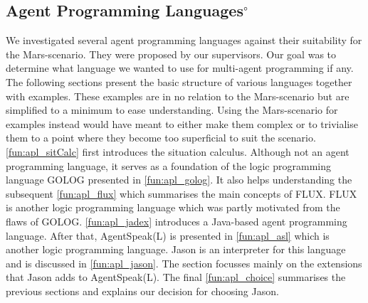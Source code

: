 \subsection[Agent Programming Languages]{Agent Programming Languages$^\circ$}
We investigated several agent programming languages against their suitability for the Mars-scenario. They were proposed by our supervisors. Our goal was to determine what language we wanted to use for multi-agent programming if any. The following sections present the basic structure of various languages together with examples. These examples are in no relation to the Mars-scenario but are simplified to a minimum to ease understanding. Using the Mars-scenario for examples instead would have meant to either make them complex or to trivialise them to a point where they become too superficial to suit the scenario.
\autoref{fun:apl_sitCalc} first introduces the situation calculus. Although not an agent programming language, it serves as a foundation of the logic programming language GOLOG presented in \autoref{fun:apl_golog}. It also helps understanding the subsequent \autoref{fun:apl_flux} which summarises the main concepts of FLUX. FLUX is another logic programming language which was partly motivated from the flaws of GOLOG. \autoref{fun:apl_jadex} introduces a Java-based agent programming language. After that, AgentSpeak(L) is presented in \autoref{fun:apl_asl} which is another logic programming language. Jason is an interpreter for this language and is discussed in \autoref{fun:apl_jason}. The section focusses mainly on the extensions that Jason adds to AgentSpeak(L). The final \autoref{fun:apl_choice} summarises the previous sections and explains our decision for choosing Jason.














